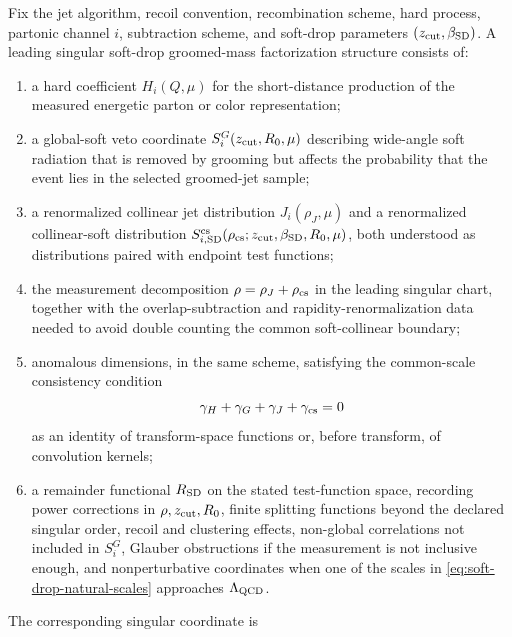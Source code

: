 \begin{definition}
\label{def:soft-drop-mass-factorization-datum}
Fix the jet algorithm, recoil convention, recombination scheme, hard process,
partonic channel \(i\), subtraction scheme, and soft-drop parameters
\((z_{\rm cut},\beta_{\rm SD})\).  A leading singular soft-drop groomed-mass
factorization structure consists of:
\begin{enumerate}
  \item a hard coefficient \(H_i(Q,\mu)\) for the short-distance production of
  the measured energetic parton or color representation;
  \item a global-soft veto coordinate \(S^{G}_i(z_{\rm cut},R_0,\mu)\)
  describing wide-angle soft radiation that is removed by grooming but affects
  the probability that the event lies in the selected groomed-jet sample;
  \item a renormalized collinear jet distribution \(J_i(\rho_J,\mu)\) and a
  renormalized collinear-soft distribution
  \(S^{\rm cs}_{i,{\rm SD}}(\rho_{\rm cs};z_{\rm cut},\beta_{\rm SD},R_0,\mu)\),
  both understood as distributions paired with endpoint test functions;
  \item the measurement decomposition
  \(\rho=\rho_J+\rho_{\rm cs}\) in the leading singular chart, together with
  the overlap-subtraction and rapidity-renormalization data needed to avoid
  double counting the common soft-collinear boundary;
  \item anomalous dimensions, in the same scheme, satisfying the common-scale
  consistency condition
  \begin{equation}
    \gamma_H+\gamma_G+\gamma_J+\gamma_{\rm cs}=0
    \label{eq:soft-drop-factorization-rg-consistency}
  \end{equation}
  as an identity of transform-space functions or, before transform, of
  convolution kernels;
  \item a remainder functional \(R_{\rm SD}\) on the stated test-function space,
  recording power corrections in \(\rho,z_{\rm cut},R_0\), finite splitting
  functions beyond the declared singular order, recoil and clustering effects,
  non-global correlations not included in \(S^G_i\), Glauber obstructions if
  the measurement is not inclusive enough, and nonperturbative coordinates when
  one of the scales in \eqref{eq:soft-drop-natural-scales} approaches
  \(\Lambda_{\rm QCD}\).
\end{enumerate}
The corresponding singular coordinate is
\begin{equation}

\end{equation}
\end{definition}
